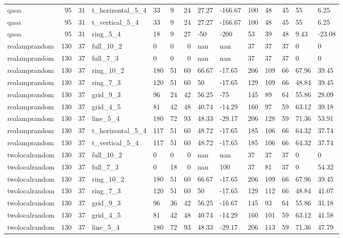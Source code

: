 \begin{longtable}{lrrlllrllllrll}
qaoa & 95 & 31 & t\_horizontal\_5\_4 & 33 & 9 & 24 & 27.27 & -166.67 & 100 & 48 & 45 & 55 & 6.25 \\
qaoa & 95 & 31 & t\_vertical\_5\_4 & 33 & 9 & 24 & 27.27 & -166.67 & 100 & 48 & 45 & 55 & 6.25 \\
qaoa & 95 & 31 & ring\_5\_4 & 18 & 9 & 27 & -50 & -200 & 53 & 39 & 48 & 9.43 & -23.08 \\
realamprandom & 130 & 37 & full\_10\_2 & 0 & 0 & 0 & nan & nan & 37 & 37 & 37 & 0 & 0 \\
realamprandom & 130 & 37 & full\_7\_3 & 0 & 0 & 0 & nan & nan & 37 & 37 & 37 & 0 & 0 \\
realamprandom & 130 & 37 & ring\_10\_2 & 180 & 51 & 60 & 66.67 & -17.65 & 206 & 109 & 66 & 67.96 & 39.45 \\
realamprandom & 130 & 37 & ring\_7\_3 & 120 & 51 & 60 & 50 & -17.65 & 129 & 109 & 66 & 48.84 & 39.45 \\
realamprandom & 130 & 37 & grid\_9\_3 & 96 & 24 & 42 & 56.25 & -75 & 145 & 89 & 64 & 55.86 & 28.09 \\
realamprandom & 130 & 37 & grid\_4\_5 & 81 & 42 & 48 & 40.74 & -14.29 & 160 & 97 & 59 & 63.12 & 39.18 \\
realamprandom & 130 & 37 & line\_5\_4 & 180 & 72 & 93 & 48.33 & -29.17 & 206 & 128 & 59 & 71.36 & 53.91 \\
realamprandom & 130 & 37 & t\_horizontal\_5\_4 & 117 & 51 & 60 & 48.72 & -17.65 & 185 & 106 & 66 & 64.32 & 37.74 \\
realamprandom & 130 & 37 & t\_vertical\_5\_4 & 117 & 51 & 60 & 48.72 & -17.65 & 185 & 106 & 66 & 64.32 & 37.74 \\
twolocalrandom & 130 & 37 & full\_10\_2 & 0 & 0 & 0 & nan & nan & 37 & 37 & 37 & 0 & 0 \\
twolocalrandom & 130 & 37 & full\_7\_3 & 0 & 18 & 0 & nan & 100 & 37 & 81 & 37 & 0 & 54.32 \\
twolocalrandom & 130 & 37 & ring\_10\_2 & 180 & 51 & 60 & 66.67 & -17.65 & 206 & 109 & 66 & 67.96 & 39.45 \\
twolocalrandom & 130 & 37 & ring\_7\_3 & 120 & 51 & 60 & 50 & -17.65 & 129 & 112 & 66 & 48.84 & 41.07 \\
twolocalrandom & 130 & 37 & grid\_9\_3 & 96 & 36 & 42 & 56.25 & -16.67 & 145 & 93 & 64 & 55.86 & 31.18 \\
twolocalrandom & 130 & 37 & grid\_4\_5 & 81 & 42 & 48 & 40.74 & -14.29 & 160 & 101 & 59 & 63.12 & 41.58 \\
twolocalrandom & 130 & 37 & line\_5\_4 & 180 & 72 & 93 & 48.33 & -29.17 & 206 & 113 & 59 & 71.36 & 47.79 \\

\end{longtable}

